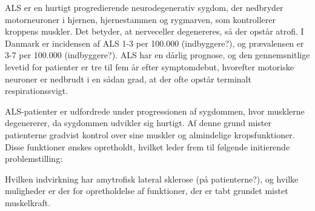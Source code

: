 ALS er en hurtigt progredierende neurodegenerativ sygdom, der nedbryder motorneuroner i hjernen, hjernestammen og rygmarven, som kontrollerer kroppens muskler. Det betyder, at nerveceller degenereres, så der opstår atrofi. I Danmark er incidensen af ALS 1-3 per 100.000 (indbyggere?), og prævalensen er 3-7 per 100.000 (indbyggere?). ALS har en dårlig prognose, og den gennemsnitlige levetid for patienter er tre til fem år efter symptomdebut, hvorefter motoriske neuroner er nedbrudt i en sådan grad, at der ofte opstår terminalt respirationssvigt. \citep{russell2015, morris2015}

ALS-patienter er udfordrede under progressionen af sygdommen, hvor musklerne degenererer, da sygdommen udvikler sig hurtigt. Af denne grund mister patienterne gradvist kontrol over sine muskler og almindelige kropsfunktioner. Disse funktioner ønskes opretholdt, hvilket leder frem til følgende initierende problemstilling:

Hvilken indvirkning har amytrofisk lateral sklerose (på patienterne?), og hvilke muligheder er der for opretholdelse af funktioner, der er tabt grundet mistet muskelkraft. 
 
